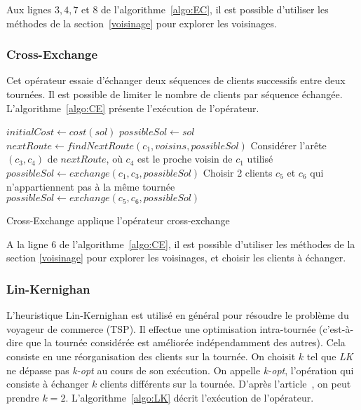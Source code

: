 \documentclass[a4paper,11pt]{article}%
\begin{document}
Aux lignes $3, 4, 7$ et $8$ de l'algorithme~\ref{algo:EC}, il est possible d'utiliser les méthodes de la section~\ref{voisinage} pour explorer les voisinages.

\subsubsection{Cross-Exchange}

Cet opérateur essaie d'échanger deux séquences de clients successifs entre deux tournées. Il est possible de limiter le nombre de clients par séquence échangée.
L'algorithme~\ref{algo:CE} présente l'exécution de l'opérateur.

\begin{algorithm}
\DontPrintSemicolon %
$initialCost \gets cost(sol)$\;
$possibleSol \gets sol$\;
$nextRoute \gets findNextRoute(c_1,voisins,possibleSol)$\;
Considérer l'arête $(c_3,c_4)$ de $nextRoute$, où $c_4$ est le proche voisin de $c_1$ utilisé\;
$possibleSol \gets exchange(c_1,c_3,possibleSol)$\;
Choisir 2 clients $c_5$ et $c_6$ qui n'appartiennent pas à la même tournée\;
$possibleSol \gets exchange(c_5,c_6,possibleSol)$\;
 {
	\;
}
\;
\caption{{\sc Cross-Exchange} applique l'opérateur cross-exchange}
\label{algo:CE}
\end{algorithm}

A la ligne $6$ de l'algorithme~\ref{algo:CE}, il est possible d'utiliser les méthodes de la section \ref{voisinage} pour explorer les voisinages, et choisir les clients à échanger.

\subsubsection{Lin-Kernighan}

L'heuristique Lin-Kernighan est utilisé en général pour résoudre le problème du voyageur de commerce (TSP). Il effectue une optimisation intra-tournée (c'est-à-dire que la tournée considérée est améliorée indépendamment des autres). Cela consiste en une réorganisation des clients sur la tournée. On choisit $k$ tel que \emph{LK} ne dépasse pas \emph{k-opt} au cours de son exécution. On appelle \emph{k-opt}, l'opération qui consiste à échanger $k$ clients différents sur la tournée. D'après l'article~\cite{Sorensen_2017}, on peut prendre $k = 2$.
L'algorithme~\ref{algo:LK} décrit l'exécution de l'opérateur.
\end{document}
